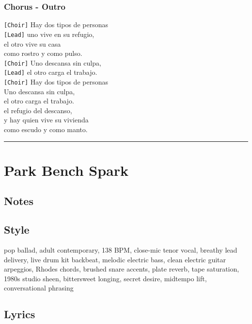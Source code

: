 \subsubsection{Chorus - Outro}\label{chorus---outro-2}

\texttt{{[}Choir{]}} Hay dos tipos de personas\\
\texttt{{[}Lead{]}} uno vive en su refugio,\\
el otro vive su casa\\
como rostro y como pulso.\\
\texttt{{[}Choir{]}} Uno descansa sin culpa,\\
\texttt{{[}Lead{]}} el otro carga el trabajo.\\
\texttt{{[}Choir{]}} Hay dos tipos de personas\\
Uno descansa sin culpa,\\
el otro carga el trabajo.\\
el refugio del descanso,\\
y hay quien vive su vivienda\\
como escudo y como manto.

\begin{center}\rule{0.5\linewidth}{0.5pt}\end{center}

\section{Park Bench Spark}\label{park-bench-spark}

\subsection{Notes}\label{notes-34}

\subsection{Style}\label{style-33}

pop ballad, adult contemporary, 138 BPM, close-mic tenor vocal, breathy
lead delivery, live drum kit backbeat, melodic electric bass, clean
electric guitar arpeggios, Rhodes chords, brushed snare accents, plate
reverb, tape saturation, 1980s studio sheen, bittersweet longing, secret
desire, midtempo lift, conversational phrasing

\subsection{Lyrics}\label{lyrics-33}

